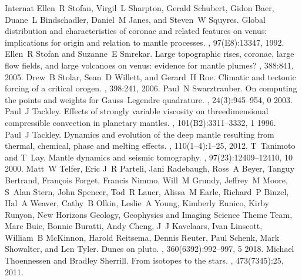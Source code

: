 \documentclass[letterpaper,10pt,english]{jupyterBook}
\begin{document}
\begin{sphinxthebibliography}{Internat}
\sphinxAtStartPar
Ellen R Stofan, Virgil L Sharpton, Gerald Schubert, Gidon Baer, Duane L Bindschadler, Daniel M Janes, and Steven W Squyres. Global distribution and characteristics of coronae and related features on venus: implications for origin and relation to mantle processes. , 97(E8):13347, 1992.
\sphinxAtStartPar
Ellen R Stofan and Suzanne E Smrekar. Large topographic rises, coronae, large flow fields, and large volcanoes on venus: evidence for mantle plumes? , 388:841, 2005.
\sphinxAtStartPar
Drew B Stolar, Sean D Willett, and Gerard H Roe. Climatic and tectonic forcing of a critical orogen. , 398:241, 2006.
\sphinxAtStartPar
Paul N Swarztrauber. On computing the points and weights for Gauss–Legendre quadrature. , 24(3):945–954, 0 2003.
\sphinxAtStartPar
Paul J Tackley. Effects of strongly variable viscosity on three\sphinxhyphen{}dimensional compressible convection in planetary mantles. , 101(B2):3311–3332, 1 1996.
\sphinxAtStartPar
Paul J Tackley. Dynamics and evolution of the deep mantle resulting from thermal, chemical, phase and melting effects. , 110(1–4):1–25, 2012.
\sphinxAtStartPar
T Tanimoto and T Lay. Mantle dynamics and seismic tomography. , 97(23):12409–12410, 10 2000.
\sphinxAtStartPar
Matt W Telfer, Eric J R Parteli, Jani Radebaugh, Ross A Beyer, Tanguy Bertrand, François Forget, Francis Nimmo, Will M Grundy, Jeffrey M Moore, S Alan Stern, John Spencer, Tod R Lauer, Alissa M Earle, Richard P Binzel, Hal A Weaver, Cathy B Olkin, Leslie A Young, Kimberly Ennico, Kirby Runyon, New Horizons Geology, Geophysics and Imaging Science Theme Team, Marc Buie, Bonnie Buratti, Andy Cheng, J J Kavelaars, Ivan Linscott, William B McKinnon, Harold Reitsema, Dennis Reuter, Paul Schenk, Mark Showalter, and Len Tyler. Dunes on pluto. , 360(6392):992–997, 5 2018.
\sphinxAtStartPar
Michael Thoennessen and Bradley Sherrill. From isotopes to the stars. , 473(7345):25, 2011.

\end{sphinxthebibliography}
\end{document}
